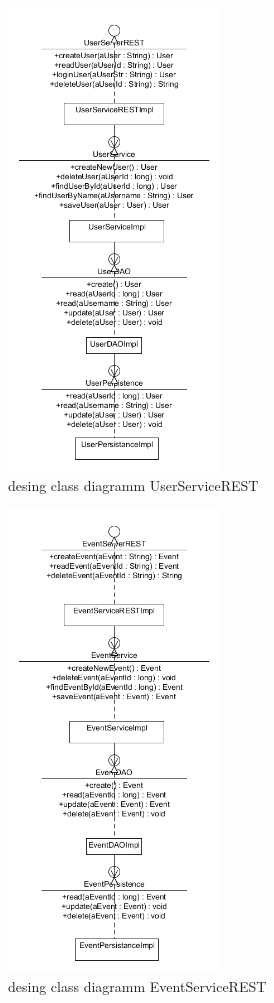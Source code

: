 \begin{figure}[htp]
\centering
\includegraphics[width=0.5\textwidth]{Ingo/pictures/Design_User.png}
\caption{desing class diagramm UserServiceREST}
\label{fig:UserServiceREST}
\end{figure}


\begin{figure}[htp]
\centering
\includegraphics[width=0.5\textwidth]{Ingo/pictures/Design_Event.png}
\caption{desing class diagramm EventServiceREST}
\label{fig:EventServiceREST}
\end{figure}


